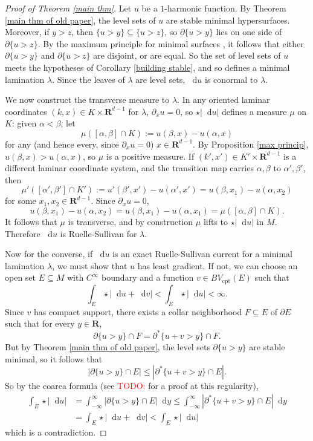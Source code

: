 \documentclass[reqno,11pt]{amsart}
\newcommand{\RR}{\mathbf{R}}
\newcommand*\dif{\mathop{}\!\mathrm{d}}
\newcommand{\cpt}{\mathrm{cpt}}
\theoremstyle{definition}
\numberwithin{equation}{section}
\newcommand\todo[1]{\textcolor{red}{TODO: #1}}
\begin{document}
\begin{proof}[Proof of Theorem \ref{main thm}]
Let $u$ be a $1$-harmonic function.
By Theorem \ref{main thm of old paper}, the level sets of $u$ are stable minimal hypersurfaces.
Moreover, if $y > z$, then $\{u > y\} \subseteq \{u > z\}$, so $\partial \{u > y\}$ lies on one side of $\partial \{u > z\}$.
By the maximum principle for minimal surfaces \cite[Corollary 1.28]{colding2011course}, it follows that either $\partial \{u > y\}$ and $\partial \{u > z\}$ are disjoint, or are equal.
So the set of level sets of $u$ meets the hypotheses of Corollary \ref{building stable}, and so defines a minimal lamination $\lambda$.
Since the leaves of $\lambda$ are level sets, $\dif u$ is conormal to $\lambda$.

We now construct the transverse measure to $\lambda$.
In any oriented laminar coordinates $(k, x) \in K \times \RR^{d - 1}$ for $\lambda$, $\partial_x u = 0$, so $\star |\dif u|$ defines a measure $\mu$ on $K$: given $\alpha < \beta$, let
$$\mu([\alpha, \beta] \cap K) := u(\beta, x) - u(\alpha, x)$$
for any (and hence every, since $\partial_x u = 0$) $x \in \RR^{d - 1}$.
By Proposition \ref{max princip}, $u(\beta, x) > u(\alpha, x)$, so $\mu$ is a positive measure.
If $(k', x') \in K' \times \RR^{d - 1}$ is a different laminar coordinate system, and the transition map carries $\alpha, \beta$ to $\alpha', \beta'$, then
$$\mu'([\alpha', \beta'] \cap K') := u'(\beta', x') - u(\alpha', x') = u(\beta, x_1) - u(\alpha, x_2)$$
for some $x_1, x_2 \in \RR^{d - 1}$. Since $\partial_x u = 0$,
$$u(\beta, x_1) - u(\alpha, x_2) = u(\beta, x_1) - u(\alpha, x_1) = \mu([\alpha, \beta] \cap K).$$
It follows that $\mu$ is transverse, and by construction $\mu$ lifts to $\star |\dif u|$ in $M$.
Therefore $\dif u$ is Ruelle-Sullivan for $\lambda$.

Now for the converse, if $\dif u$ is an exact Ruelle-Sullivan current for a minimal lamination $\lambda$, we must show that $u$ has least gradient.
If not, we can choose an open set $E \subseteq M$ with $C^\infty$ boundary and a function $v \in BV_\cpt(E)$ such that
$$\int_E \star |\dif u + \dif v| < \int_E \star |\dif u| < \infty.$$
Since $v$ has compact support, there exists a collar neighborhood $F \subseteq E$ of $\partial E$ such that for every $y \in \RR$,
$$\partial \{u > y\} \cap F = \partial^* \{u + v > y\} \cap F.$$
But by Theorem \ref{main thm of old paper}, the level sets $\partial \{u > y\}$ are stable minimal, so it follows that
$$|\partial \{u > y\} \cap E| \leq |\partial^* \{u + v > y\} \cap E|.$$
So by the coarea formula (see \todo{\cite{BackusFLG}}  for a proof at this regularity),
\begin{align*}
\int_E \star |\dif u| &= \int_{-\infty}^\infty |\partial \{u > y\} \cap E| \dif y \leq \int_{-\infty}^\infty |\partial^* \{u + v > y\} \cap E| \dif y \\
&= \int_E \star |\dif u + \dif v| < \int_E \star |\dif u|
\end{align*}
which is a contradiction.
\end{proof}


\printbibliography
\end{document}
